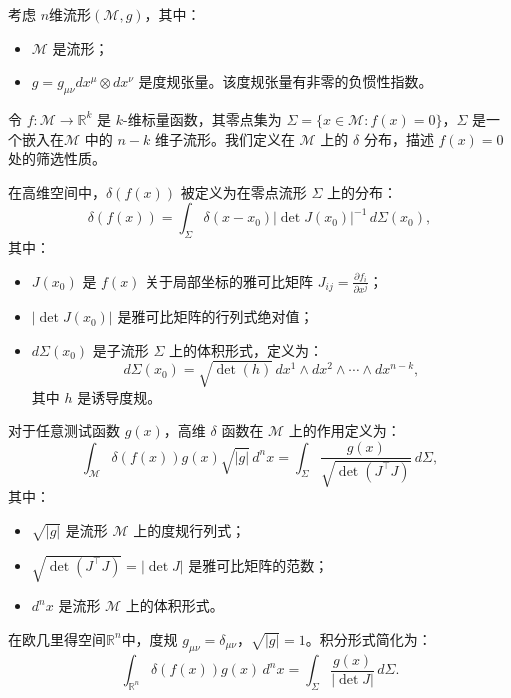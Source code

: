 \documentclass[lang=cn,10pt,newtx,bibend=biber,device=pad]{elegantbook}
\begin{document}
\begin{definition}
考虑 $n$维流形$(\mathcal{M}, g)$，其中：
\begin{itemize}
    \item $\mathcal{M}$ 是流形；
    \item $g = g_{\mu\nu} dx^\mu \otimes dx^\nu$ 是度规张量。该度规张量有非零的负惯性指数。
\end{itemize}
令 $f: \mathcal{M} \to \mathbb{R}^k$ 是 $k$-维标量函数，其零点集为 $\Sigma = \{x \in \mathcal{M} : f(x) = 0\}$，$\Sigma$ 是一个嵌入在$\mathcal{M}$ 中的 $n-k$ 维子流形。我们定义在 $\mathcal{M}$ 上的 $\delta$ 分布，描述 $f(x) = 0$ 处的筛选性质。

在高维空间中，$\delta(f(x))$ 被定义为在零点流形 $\Sigma$ 上的分布：
\begin{equation}
\delta(f(x)) = \int_{\Sigma} \delta(x - x_0) |\det J(x_0)|^{-1} \, d\Sigma(x_0),
\end{equation}
其中：
\begin{itemize}
    \item $J(x_0)$ 是 $f(x)$ 关于局部坐标的雅可比矩阵 $J_{ij} = \frac{\partial f_i}{\partial x^j}$；
    \item $|\det J(x_0)|$ 是雅可比矩阵的行列式绝对值；
    \item $d\Sigma(x_0)$ 是子流形 $\Sigma$ 上的体积形式，定义为：
        \begin{equation}
        d\Sigma(x_0) = \sqrt{\det (h)} \, dx^1 \wedge dx^2 \wedge \cdots \wedge dx^{n-k},
        \end{equation}
    其中 $h$ 是诱导度规。
\end{itemize}

对于任意测试函数 $g(x)$，高维 $\delta$ 函数在 $\mathcal{M}$ 上的作用定义为：
\begin{equation}
\int_{\mathcal{M}} \delta(f(x)) g(x) \sqrt{|g|} \, d^n x = \int_\Sigma \frac{g(x)}{\sqrt{\det (J^\top J)}} \, d\Sigma,
\end{equation}
其中：
\begin{itemize}
    \item $\sqrt{|g|}$ 是流形 $\mathcal{M}$ 上的度规行列式；
    \item $\sqrt{\det (J^\top J)} = |\det J|$ 是雅可比矩阵的范数；
    \item $d^n x$ 是流形 $\mathcal{M}$ 上的体积形式。
\end{itemize}

在欧几里得空间$\mathbb{R}^n$中，度规 $g_{\mu\nu} = \delta_{\mu\nu}$，$\sqrt{|g|} = 1$。积分形式简化为：
\begin{equation}
\int_{\mathbb{R}^n} \delta(f(x)) g(x) \, d^n x = \int_\Sigma \frac{g(x)}{|\det J|} \, d\Sigma.
\end{equation}
\end{definition}
\end{document}
